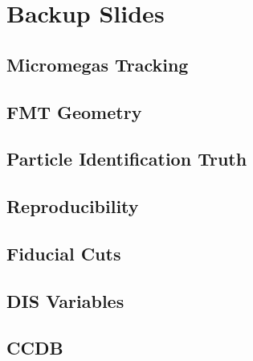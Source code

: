 \section*{}
\begin{frame}{}
    \centering \Huge{}
\end{frame}

\section*{Backup Slides}
\subsection*{Micromegas Tracking}


\subsection*{FMT Geometry}


\subsection*{Particle Identification Truth}


\subsection*{Reproducibility}


\subsection*{Fiducial Cuts}


\subsection*{DIS Variables}


\subsection*{CCDB}


% 

